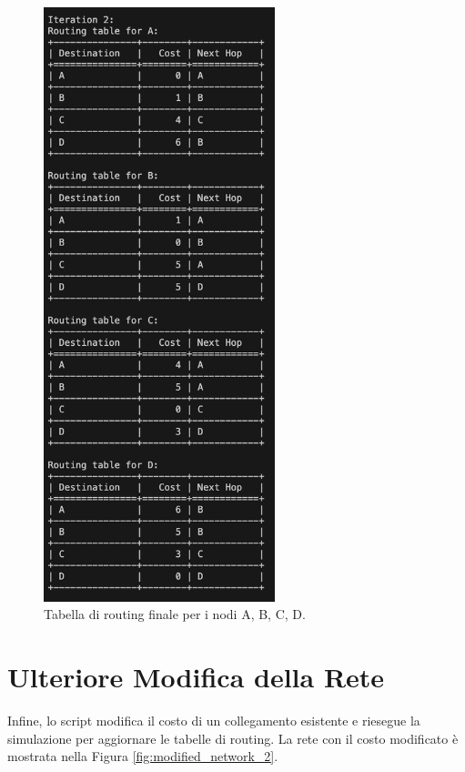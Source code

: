 \documentclass{report}
\begin{document}
\begin{figure}[H]
    \centering
    \includegraphics[width=0.6\textwidth]{img/rete2fine.png}
    \caption{Tabella di routing finale per i nodi A, B, C, D.}
    \label{fig:final_routing_table_2}
\end{figure}

\section{Ulteriore Modifica della Rete}
Infine, lo script modifica il costo di un collegamento esistente e riesegue la simulazione per aggiornare le tabelle di routing. La rete con il costo modificato è mostrata nella Figura \ref{fig:modified_network_2}.
\end{document}
